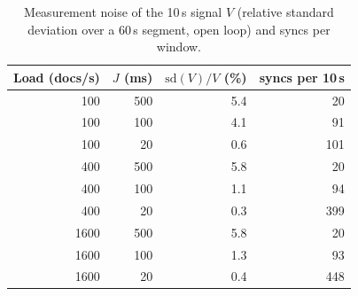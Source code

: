 \begin{table}[t]\centering\small
\caption{Measurement noise of the 10\,s signal $V$ (relative standard deviation over a 60\,s segment, open loop) and syncs per window.}\label{tab:noise}
\begin{tabular}{rrrr}\toprule
Load (docs/s) & $J$ (ms) & $\mathrm{sd}(V)/V$ (\%) & syncs per 10\,s\\\midrule
100 & 500 & 5.4 & 20\\
100 & 100 & 4.1 & 91\\
100 & 20 & 0.6 & 101\\
400 & 500 & 5.8 & 20\\
400 & 100 & 1.1 & 94\\
400 & 20 & 0.3 & 399\\
1600 & 500 & 5.8 & 20\\
1600 & 100 & 1.3 & 93\\
1600 & 20 & 0.4 & 448\\
\bottomrule\end{tabular}\end{table}
